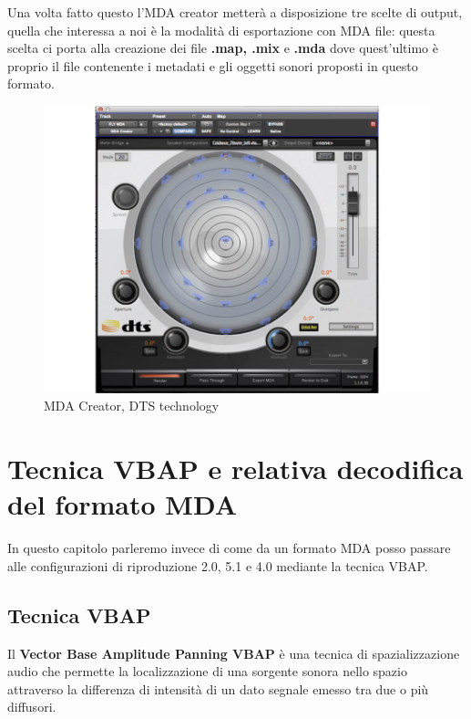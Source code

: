 \documentclass[12pt,a4paper]{report}
\begin{document}
Una volta fatto questo l'MDA creator metterà a disposizione tre scelte di output, quella che interessa a noi è la modalità di esportazione con MDA file: questa scelta ci porta alla creazione dei file \textbf{.map, .mix} e \textbf{.mda} dove quest'ultimo è proprio il file contenente i metadati e gli oggetti sonori proposti in questo formato.

\begin{figure}[htbp]
	\centering
	\includegraphics[scale=0.50]{figures/mdacreator.jpg}
	\caption {MDA Creator, DTS technology}
	\label{fig:mdacreator}
	\end{figure}

\chapter{Tecnica VBAP e relativa decodifica del formato MDA}

In questo capitolo parleremo invece di come da un formato MDA posso passare alle configurazioni di riproduzione 2.0, 5.1 e 4.0 mediante la tecnica VBAP.


\section{Tecnica VBAP}

Il \textbf{Vector Base Amplitude Panning VBAP} è una tecnica di spazializzazione audio che permette la localizzazione di  una sorgente sonora nello spazio attraverso la differenza di intensità di un dato segnale emesso tra due o più diffusori.
\end{document}
